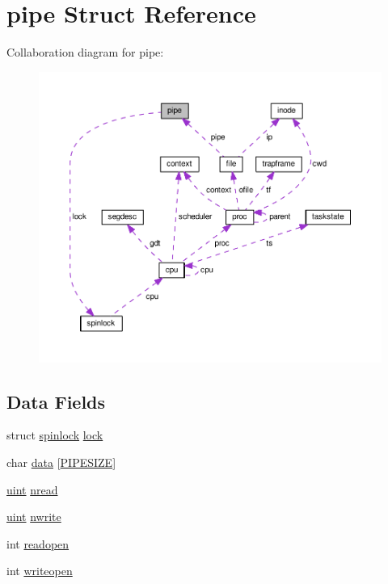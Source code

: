 \hypertarget{structpipe}{\section{pipe Struct Reference}
\label{structpipe}
}


Collaboration diagram for pipe\-:
\nopagebreak
\begin{figure}[H]
\begin{center}
\leavevmode
\includegraphics[width=350pt]{structpipe__coll__graph}
\end{center}
\end{figure}
\subsection*{Data Fields}
\begin{DoxyCompactItemize}
\item 
struct \hyperlink{structspinlock}{spinlock} \hyperlink{structpipe_ab28e82cd5dda7d960095706a3ea20572}{lock}
\item 
char \hyperlink{structpipe_a4b9a650598bf6f6eff13ff36793ec4f4}{data} \mbox{[}\hyperlink{pipe_8c_ad3dc9214a710d7a6c516cbaa2a12a1de}{P\-I\-P\-E\-S\-I\-Z\-E}\mbox{]}
\item 
\hyperlink{types_8h_a91ad9478d81a7aaf2593e8d9c3d06a14}{uint} \hyperlink{structpipe_a0e346df9e608d0a7d2c8538f50ec39a7}{nread}
\item 
\hyperlink{types_8h_a91ad9478d81a7aaf2593e8d9c3d06a14}{uint} \hyperlink{structpipe_a089f1ec4d2ea845105344cd1121dd3ae}{nwrite}
\item 
int \hyperlink{structpipe_a2c616f92018c3e3ed5337568ec96173f}{readopen}
\item 
int \hyperlink{structpipe_ae4254bf1d401e056beef1e2630c334e5}{writeopen}
\end{DoxyCompactItemize}


